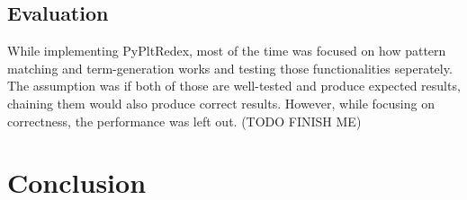 \subsection{Evaluation}
While implementing PyPltRedex, most of the time was focused on how pattern matching and term-generation works and testing those functionalities seperately. The assumption was if both of those are well-tested and produce expected results, chaining them would also produce correct results. However, while focusing on correctness, the performance was left out. (TODO FINISH ME)


\section{Conclusion}
